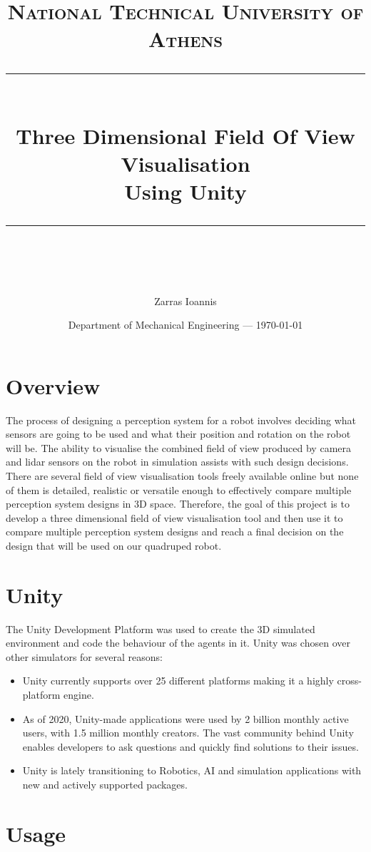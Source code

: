 \documentclass{article}
\title{	
	\normalfont\normalsize
	\textsc{National Technical University of Athens}\\ %
	\vspace{25pt} %
	\rule{\linewidth}{0.5pt}\\ %
	\vspace{20pt} %
	{\LARGE Three Dimensional Field Of View Visualisation}\\ %
	\vspace{5pt}
	{\LARGE Using Unity}\\
	\vspace{12pt} %
	\rule{\linewidth}{2pt}\\ %
	\vspace{12pt} %
}
\author{\LARGE Zarras Ioannis} %
\date{Department of Mechanical Engineering --- \today}
\begin{document}
\maketitle
\tableofcontents

\section{Overview}

The process of designing a perception system for a robot involves deciding what sensors are going to be used and what their position and rotation on the robot will be. The ability to visualise the combined field of view produced by camera and lidar sensors on the robot in simulation assists with such design decisions. There are several field of view visualisation tools freely available online but none of them is detailed, realistic or versatile enough to effectively compare multiple perception system designs in 3D space. Therefore, the goal of this project is to develop a three dimensional field of view visualisation tool and then use it to compare multiple perception system designs and reach a final decision on the design that will be used on our quadruped robot.

\section{Unity}

The Unity Development Platform was used to create the 3D simulated environment and code the behaviour of the agents in it. Unity was chosen over other simulators for several reasons:

\begin{itemize}
    \item Unity currently supports over 25 different platforms making it a highly cross-platform engine. \cite{software_what_nodate}
    \item As of 2020, Unity-made applications were used by 2 billion monthly active users, with 1.5 million monthly creators. \cite{noauthor_unity_2022}   The vast community behind Unity enables developers to ask questions and quickly find solutions to their issues.
    \item Unity is lately transitioning to Robotics, AI and simulation applications with new and actively supported packages.
\end{itemize}

\section{Usage}
\end{document}
